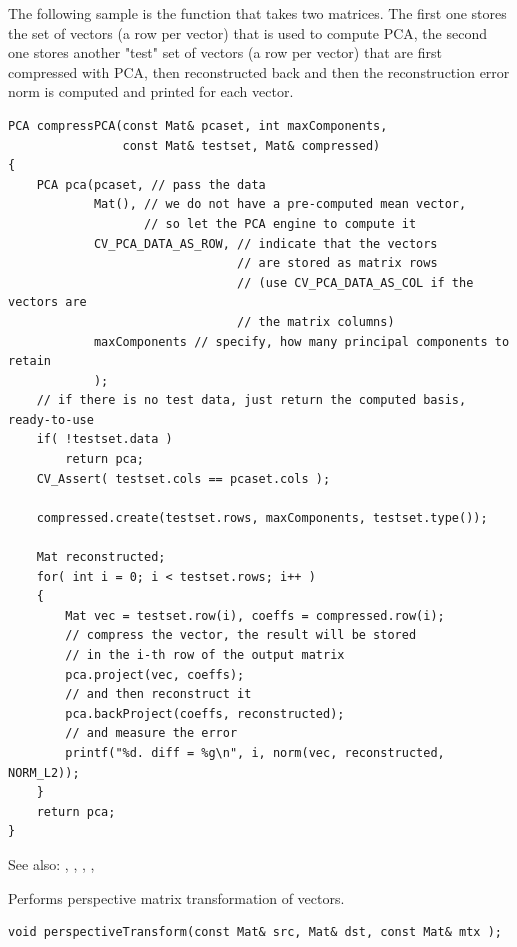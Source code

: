 The following sample is the function that takes two matrices. The first one stores the set of vectors (a row per vector) that is used to compute PCA, the second one stores another "test" set of vectors (a row per vector) that are first compressed with PCA, then reconstructed back and then the reconstruction error norm is computed and printed for each vector.
\begin{lstlisting}
PCA compressPCA(const Mat& pcaset, int maxComponents,
                const Mat& testset, Mat& compressed)
{
    PCA pca(pcaset, // pass the data
            Mat(), // we do not have a pre-computed mean vector,
                   // so let the PCA engine to compute it
            CV_PCA_DATA_AS_ROW, // indicate that the vectors
                                // are stored as matrix rows
                                // (use CV_PCA_DATA_AS_COL if the vectors are
                                // the matrix columns)
            maxComponents // specify, how many principal components to retain
            );
    // if there is no test data, just return the computed basis, ready-to-use
    if( !testset.data )
        return pca;
    CV_Assert( testset.cols == pcaset.cols );

    compressed.create(testset.rows, maxComponents, testset.type());

    Mat reconstructed;
    for( int i = 0; i < testset.rows; i++ )
    {
        Mat vec = testset.row(i), coeffs = compressed.row(i);
        // compress the vector, the result will be stored
        // in the i-th row of the output matrix
        pca.project(vec, coeffs);
        // and then reconstruct it
        pca.backProject(coeffs, reconstructed);
        // and measure the error
        printf("%d. diff = %g\n", i, norm(vec, reconstructed, NORM_L2));
    }
    return pca;
}
\end{lstlisting}

See also: , , , , 

\label{perspectiveTransform}
Performs perspective matrix transformation of vectors.

\begin{lstlisting}
void perspectiveTransform(const Mat& src, Mat& dst, const Mat& mtx );
\end{lstlisting}
\begin{description}
\end{description}

